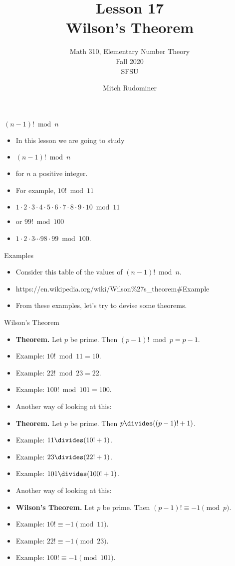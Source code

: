 \documentclass{beamer}
\title{Lesson 17 \\ Wilson's Theorem}
\subtitle{Math 310, Elementary Number Theory \\ Fall 2020 \\ SFSU}
\author{Mitch Rudominer}
\date{}
\begin{document}
\begin{frame}
  \titlepage
\end{frame}

\begin{frame}{$(n-1)! \bmod n$}

\begin{itemize}
  \item In this lesson we are going to study
  \item $(n-1)! \bmod n$
  \item for $n$ a positive integer.
  \item For example, $10! \bmod 11$
  \item $1\cdot 2\cdot 3 \cdot 4 \cdot 5 \cdot 6 \cdot 7 \cdot 8 \cdot 9 \cdot 10 \bmod 11$
  \item or $99! \bmod 100$
  \item $1\cdot 2 \cdot 3 \cdots 98 \cdot 99 \bmod 100$.
\end{itemize}

\end{frame}

\begin{frame}{Examples}

\begin{itemize}
  \item Consider this table of the values of $(n-1)! \bmod n$.
  \item https://en.wikipedia.org/wiki/Wilson\%27s\_theorem\#Example
  \item From these examples, let's try to devise some theorems.
\end{itemize}

\end{frame}

\begin{frame}{Wilson's Theorem}

\begin{itemize}
  \item \textbf{Theorem.} Let $p$ be prime. Then $(p-1)! \bmod p = p-1$.
  \item Example: $10! \bmod 11 = 10$.
  \item Example: $22! \bmod 23 = 22$.
  \item Example: $100! \bmod 101 = 100$.
  \item Another way of looking at this:
  \item \textbf{Theorem.} Let $p$ be prime. Then $p \divides ((p-1)! + 1)$.
  \item Example: $11 \divides (10!+1)$.
  \item Example: $23 \divides (22!+1)$.
  \item Example: $101 \divides (100! + 1)$.
  \item Another way of looking at this:
  \item \textbf{Wilson's Theorem.} Let $p$ be prime. Then $(p-1)! \equiv -1 \pmod p$.
  \item Example: $10! \equiv -1  \pmod {11}$.
  \item Example: $22! \equiv -1  \pmod {23}$.
  \item Example: $100! \equiv -1 \pmod {101}$.
\end{itemize}

\end{frame}
\end{document}
